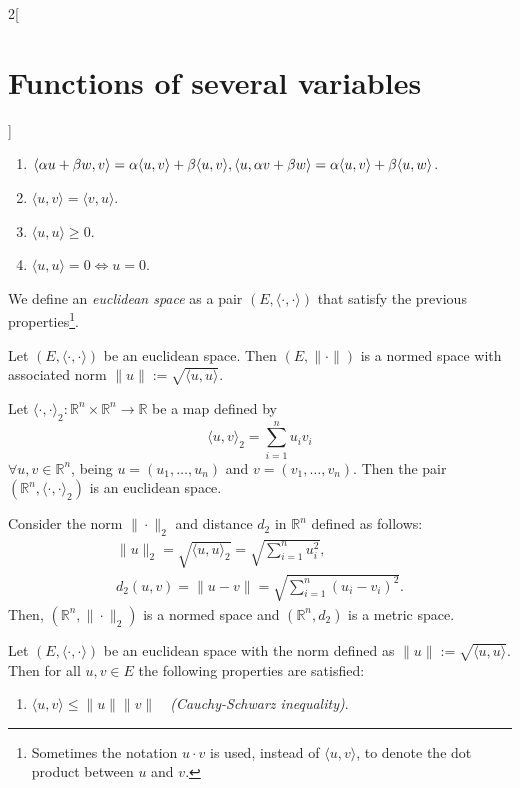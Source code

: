 \documentclass[../../../main.tex]{subfiles}
\begin{document}
\begin{multicols}{2}[\section{Functions of several variables}]
\begin{definition}
\begin{enumerate}
    \item $\langle \alpha u+\beta w,v\rangle=\alpha\langle u,v\rangle+\beta\langle u,v\rangle,\\\langle u,\alpha v+\beta w\rangle=\alpha\langle u,v\rangle+\beta\langle u,w\rangle$.
    \item $\langle u,v\rangle=\langle v,u\rangle$.
    \item $\langle u,u\rangle\geq 0$.
    \item $\langle u,u\rangle=0\iff u=0$.
\end{enumerate}
We define an \textit{euclidean space} as a pair $(E,\langle\cdot,\cdot\rangle)$ that satisfy the previous properties\footnote{Sometimes the notation $u\cdot v$ is used, instead of $\langle u,v\rangle$, to denote the dot product between $u$ and $v$.}.
\end{definition}
\begin{prop}
Let $(E,\langle\cdot,\cdot\rangle)$ be an euclidean space. Then $(E,\|\cdot\|)$ is a normed space with associated norm $\|u\|:=\sqrt{\langle u,u\rangle}$.
\end{prop}
\begin{prop}
Let $\langle\cdot,\cdot\rangle_2:\mathbb{R}^n\times\mathbb{R}^n\rightarrow\mathbb{R}$ be a map defined by $$\langle u,v\rangle_2=\sum_{i=1}^nu_iv_i$$ $\forall u,v\in \mathbb{R}^n$, being $u=(u_1,\ldots,u_n)$ and $v=(v_1,\ldots,v_n)$. Then the pair $(\mathbb{R}^n,\langle\cdot,\cdot\rangle_2)$ is an euclidean space.
\end{prop}
\begin{corollary}
Consider the norm $\|\cdot\|_2$ and distance $d_2$ in $\mathbb{R}^n$ defined as follows:
\begin{gather*}
    \|u\|_2=\sqrt{\langle u,u\rangle_2}=\sqrt{\sum_{i=1}^nu_i^2},\\
    d_2(u,v)=\|u-v\|=\sqrt{\sum_{i=1}^n(u_i-v_i)^2}.
\end{gather*}
Then, $(\mathbb{R}^n,\|\cdot\|_2)$ is a normed space and $(\mathbb{R}^n,d_2)$ is a metric space.
\end{corollary}
\begin{prop}
Let $(E,\langle\cdot,\cdot\rangle)$ be an euclidean space with the norm defined as $\|u\|:=\sqrt{\langle u,u\rangle}$. Then for all $u,v\in E$ the following properties are satisfied:
\begin{enumerate}
    \item $\langle u,v\rangle\leq\|u\|\|v\|\quad$\textit{(Cauchy-Schwarz inequality)}.

\end{enumerate}
\end{prop}
\end{multicols}
\end{document}
